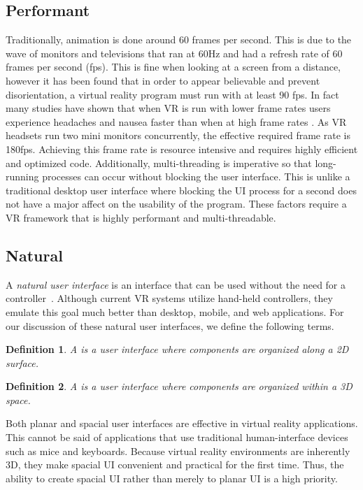 \documentclass[conference,12pt]{IEEEtran}
\newtheorem{definition}{Definition}
\begin{document}
\subsection{Performant}\label{sec:performant}
Traditionally, animation is done around 60 frames per second.  This is due to the
wave of monitors and televisions that ran at 60Hz and had a refresh rate of
60 frames per second (fps).  This is fine when looking at a screen from a distance,
however it has been found that in order to appear believable and prevent
disorientation, a virtual reality program must run with at least 90 fps.
In fact many studies have shown that when VR is run with lower frame rates
users experience headaches and nausea faster than when at high frame rates
\cite{irisVR}. As VR headsets run two mini monitors concurrently, the effective
required frame rate is 180fps.  Achieving this frame rate is resource intensive
and requires highly efficient and optimized code. Additionally, multi-threading
is imperative so that long-running processes can occur without blocking the user
interface. This is unlike a traditional desktop user interface where blocking
the UI process for a second does not have a major affect on the usability of the
program. These factors require a VR framework that is highly performant and
multi-threadable.

\subsection{Natural}\label{sec:natural}
A \textit{natural user interface} is an interface that can be used without the
need for a controller~\cite{Wimmers:2015:VR:Natural-UI}. Although current VR
systems utilize hand-held controllers, they emulate this goal much better than
desktop, mobile, and web applications. For our discussion of these natural user
interfaces, we define the following terms.

\begin{definition}\label{def:planar-ui}
    A {\normalfont{}} is a user interface where components are
    organized along a 2D surface.
\end{definition}

\begin{definition}\label{def:spacial-ui}
    A {\normalfont{}} is a user interface where components are
    organized within a 3D space.
\end{definition}

Both planar and spacial user interfaces are effective in virtual reality
applications. This cannot be said of applications that use traditional
human-interface devices such as mice and keyboards. Because virtual reality
environments are inherently 3D, they make spacial UI convenient and practical
for the first time. Thus, the ability to create spacial UI rather than merely to
planar UI is a high priority.
\end{document}
